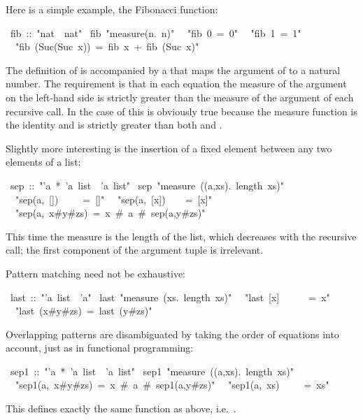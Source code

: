 \begin{isabelle}%
%
\begin{isamarkuptext}%
Here is a simple example, the Fibonacci function:%
\end{isamarkuptext}%
~fib~::~{"}nat~{\isasymRightarrow}~nat{"}\isanewline
{}~fib~{"}measure({\isasymlambda}n.~n){"}\isanewline
~~{"}fib~0~=~0{"}\isanewline
~~{"}fib~1~=~1{"}\isanewline
~~{"}fib~(Suc(Suc~x))~=~fib~x~+~fib~(Suc~x){"}%
\begin{isamarkuptext}%
\noindent
The definition of  is accompanied by a 
 that maps the argument of  to a
natural number. The requirement is that in each equation the measure of the
argument on the left-hand side is strictly greater than the measure of the
argument of each recursive call. In the case of  this is
obviously true because the measure function is the identity and
 is strictly greater than both  and
.

Slightly more interesting is the insertion of a fixed element
between any two elements of a list:%
\end{isamarkuptext}%
~sep~::~{"}'a~*~'a~list~{\isasymRightarrow}~'a~list{"}\isanewline
{}~sep~{"}measure~({\isasymlambda}(a,xs).~length~xs){"}\isanewline
~~{"}sep(a,~[])~~~~~=~[]{"}\isanewline
~~{"}sep(a,~[x])~~~~=~[x]{"}\isanewline
~~{"}sep(a,~x\#y\#zs)~=~x~\#~a~\#~sep(a,y\#zs){"}%
\begin{isamarkuptext}%
\noindent
This time the measure is the length of the list, which decreases with the
recursive call; the first component of the argument tuple is irrelevant.

Pattern matching need not be exhaustive:%
\end{isamarkuptext}%
~last~::~{"}'a~list~{\isasymRightarrow}~'a{"}\isanewline
{}~last~{"}measure~({\isasymlambda}xs.~length~xs){"}\isanewline
~~{"}last~[x]~~~~~~=~x{"}\isanewline
~~{"}last~(x\#y\#zs)~=~last~(y\#zs){"}%
\begin{isamarkuptext}%
Overlapping patterns are disambiguated by taking the order of equations into
account, just as in functional programming:%
\end{isamarkuptext}%
~sep1~::~{"}'a~*~'a~list~{\isasymRightarrow}~'a~list{"}\isanewline
{}~sep1~{"}measure~({\isasymlambda}(a,xs).~length~xs){"}\isanewline
~~{"}sep1(a,~x\#y\#zs)~=~x~\#~a~\#~sep1(a,y\#zs){"}\isanewline
~~{"}sep1(a,~xs)~~~~~=~xs{"}%
\begin{isamarkuptext}%
\noindent
This defines exactly the same function as  above, i.e.\
.


\end{isamarkuptext}
\end{isabelle}
